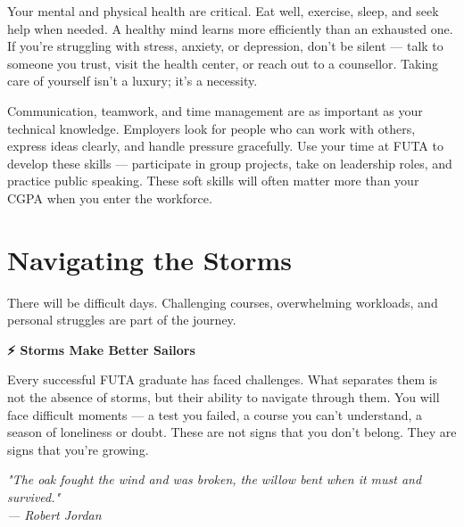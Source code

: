 \documentclass[11pt,a4paper]{article}
\newcommand{\quotetext}[1]{\begin{quotebox}\itshape\color{primary}#1\end{quotebox}}
\begin{document}
\begin{tcolorbox}[colback=lightGray,colframe=primary,title={\color{white}\textbf{Prioritize Your Well-being}},colbacktitle=primary,arc=4pt,breakable]
Your mental and physical health are critical. Eat well, exercise, sleep, and seek help when needed. A healthy mind learns more efficiently than an exhausted one. If you're struggling with stress, anxiety, or depression, don't be silent --- talk to someone you trust, visit the health center, or reach out to a counsellor. Taking care of yourself isn't a luxury; it's a necessity.
\end{tcolorbox}

\begin{tcolorbox}[colback=lightGray,colframe=primary,title={\color{white}\textbf{Develop Soft Skills}},colbacktitle=primary,arc=4pt,breakable]
Communication, teamwork, and time management are as important as your technical knowledge. Employers look for people who can work with others, express ideas clearly, and handle pressure gracefully. Use your time at FUTA to develop these skills --- participate in group projects, take on leadership roles, and practice public speaking. These soft skills will often matter more than your CGPA when you enter the workforce.
\end{tcolorbox}

\newpage
\section{Navigating the Storms}

There will be difficult days. Challenging courses, overwhelming workloads, and personal struggles are part of the journey.

\begin{inspirational}
    \textbf{\color{primary}\Large ⚡ Storms Make Better Sailors}

    \vspace{0.5em}

    Every successful FUTA graduate has faced challenges. What separates them is not the absence of storms, but their ability to navigate through them. You will face difficult moments --- a test you failed, a course you can't understand, a season of loneliness or doubt. These are not signs that you don't belong. They are signs that you're growing.

    \vspace{0.5em}

    \quotetext{"The oak fought the wind and was broken, the willow bent when it must and survived." \\ --- Robert Jordan}
\end{inspirational}
\end{document}
